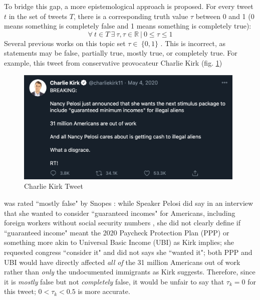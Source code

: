 \documentclass[preprint,review,12pt]{elsarticle}
\begin{document}
To bridge this gap, a more epistemological approach is proposed. For every tweet $t$ in the set of tweets $T$, there is a corresponding truth value $\tau$ between 0 and 1 (0 means something is completely false and 1 means something is completely true):
\begin{equation}
\label{truthvalues}
    \forall \ t \in T \ \exists \ \tau, \tau \in \mathbb{R} \ | \ 0 \leq \tau \leq 1
\end{equation}
Several previous works on this topic set $\tau \in \ \{0,1\}$ \cite{liu2018early,shu2017fake}. This is incorrect, as statements may be false, partially true, mostly true, or completely true. For example, this tweet from conservative provocateur Charlie Kirk (fig. \ref{fig:Charlie Kirk Tweet, May 4, 2020})  \begin{figure}[h]
    \centering
    \includegraphics[width=11cm]{CharlieKirk Tweet.png}
    \caption{Charlie Kirk Tweet \cite{kirk2020tweet}}
    \label{fig:Charlie Kirk Tweet, May 4, 2020}
\end{figure} was rated ``mostly false" by Snopes \cite{lee2020pelosi}: while Speaker Pelosi did say in an interview that she wanted to consider ``guaranteed incomes" for Americans, including foreign workers without social security numbers \cite{pelosi2020maher}, she did not clearly define if ``guaranteed income" meant the 2020 Paycheck Protection Plan (PPP) or something more akin to Universal Basic Income (UBI) as Kirk implies; she requested congress ``consider it" and did not says she ``wanted it"; both PPP and UBI would have directly affected \textit{all of} the 31 million Americans out of work rather than \textit{only} the undocumented immigrants as Kirk suggests. Therefore, since it is \textit{mostly} false but not \textit{completely} false, it would be unfair to say that $\tau_k = 0$ for this tweet; $ 0 < \tau_k < 0.5$ is more accurate. 
\end{document}
